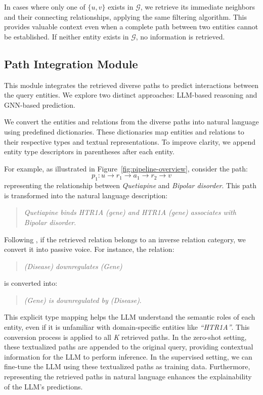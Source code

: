 In cases where only one of \( \{u, v\} \) exists in $\mathcal{G}$, we retrieve its immediate neighbors and their connecting relationships, applying the same filtering algorithm.  
This provides valuable context even when a complete path between two entities cannot be established.  
If neither entity exists in $\mathcal{G}$, no information is retrieved. 


\subsection{Path Integration Module}
This module integrates the retrieved diverse paths to predict interactions between the query entities.
We explore two distinct approaches: LLM-based reasoning and GNN-based prediction.

 \label{llm-reasoning}
We convert the entities and relations from the diverse paths into natural language using predefined dictionaries.
These dictionaries map entities and relations to their respective types and textual representations.
To improve clarity, we append entity type descriptors in parentheses after each entity.

For example, as illustrated in Figure~\ref{fig:pipeline-overview}, consider the path:
\[
p_1 : u \rightarrow r_1 \rightarrow a_1 \rightarrow r_2 \rightarrow v
\]
representing the relationship between \textit{Quetiapine} and \textit{Bipolar disorder}. This path is transformed into the natural language description:

\begin{quote}
    \textit{Quetiapine binds HTR1A (gene) and HTR1A (gene) associates with Bipolar disorder}.
\end{quote}

Following \cite {zhang2023emergingdruginteractionprediction}, if the retrieved relation belongs to an inverse relation category, we convert it into passive voice. For instance, the relation:

\begin{quote}
    \textit{(Disease) downregulates (Gene)}
\end{quote}

is converted into:

\begin{quote}
    \textit{(Gene) is downregulated by (Disease)}.
\end{quote}

This explicit type mapping helps the LLM understand the semantic roles of each entity, even if it is unfamiliar with domain-specific entities like \textit{``HTR1A''}.
This conversion process is applied to all \textit{K} retrieved paths.
In the zero-shot setting, these textualized paths are appended to the original query, providing contextual information for the LLM to perform inference.
In the supervised setting, we can fine-tune the LLM using these textualized paths as training data.
Furthermore, representing the retrieved paths in natural language enhances the explainability of the LLM's predictions.


